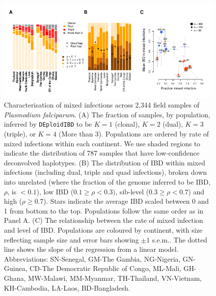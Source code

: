 \documentclass[9pt,lineno]{elife}
\begin{document}
\begin{figure}[htp]
  \begin{center}
    \includegraphics[width=\textwidth]{Fig4.pdf}
    \caption{Characterisation of mixed infections across 2,344 field samples of {\it Plasmodium falciparum}. (A) The fraction of samples, by population, inferred by \texttt{DEploidIBD} to be $K=1$ (clonal), $K=2$ (dual), $K=3$ (triple), or $K=4$ (More than 3).  Populations are ordered by rate of mixed infections within each continent. We use shaded regions to indicate the distribution of 787 samples that have low-confidence deconvolved haplotypes.  (B) The distribution of IBD within mixed infections (including dual, triple and quad infections), broken down into unrelated (where the fraction of the genome inferred to be IBD, $\rho$, is $< 0.1$), low IBD ($0.1 \geq \rho < 0.3)$, sib-level ($0.3 \geq \rho <0.7$) and high ($\rho \geq 0.7$). Stars indicate the average IBD scaled between 0 and 1 from bottom to the top.  Populations follow the same order as in Panel A.  (C) The relationship between the rate of mixed infection and level of IBD. Populations are coloured by continent, with size reflecting sample size and error bars showing $\pm 1$ s.e.m..  The dotted line shows the slope of the regression from a linear model.  Abbreviations: SN-Senegal, GM-The Gambia, NG-Nigeria, GN-Guinea, CD-The Democratic Republic of Congo, ML-Mali, GH-Ghana, MW-Malawi, MM-Myanmar, TH-Thailand, VN-Vietnam, KH-Cambodia, LA-Laos, BD-Bangladesh.} \label{fig:mixInfPlot}
  \end{center}
\end{figure}
\end{document}
